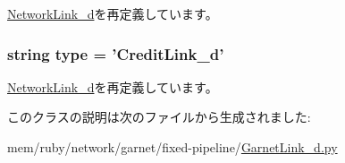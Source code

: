 \hyperlink{classGarnetLink__d_1_1NetworkLink__d_a17da7064bc5c518791f0c891eff05fda}{NetworkLink\_\-d}を再定義しています。\hypertarget{classGarnetLink__d_1_1CreditLink__d_acce15679d830831b0bbe8ebc2a60b2ca}{
\subsubsection[{type}]{\setlength{\rightskip}{0pt plus 5cm}string {\bf type} = '{\bf CreditLink\_\-d}'}}
\label{classGarnetLink__d_1_1CreditLink__d_acce15679d830831b0bbe8ebc2a60b2ca}


\hyperlink{classGarnetLink__d_1_1NetworkLink__d_acce15679d830831b0bbe8ebc2a60b2ca}{NetworkLink\_\-d}を再定義しています。

このクラスの説明は次のファイルから生成されました:\begin{DoxyCompactItemize}
\item 
mem/ruby/network/garnet/fixed-\/pipeline/\hyperlink{GarnetLink__d_8py}{GarnetLink\_\-d.py}\end{DoxyCompactItemize}
